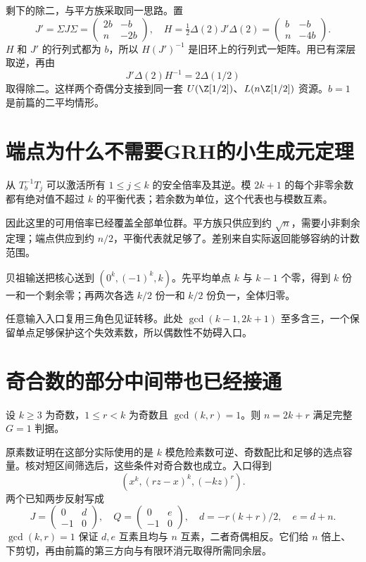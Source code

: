 剩下的除二，与平方族采取同一思路。置
\[
J'=\Sigma J\Sigma=\begin{pmatrix}2b&-b\\n&-2b\end{pmatrix},
\quad H=\tfrac12\Delta(2)J'\Delta(2)
=\begin{pmatrix}b&-b\\n&-4b\end{pmatrix}.
\]
$H$ 和 $J'$ 的行列式都为 $b$，所以 $H(J')^{-1}$ 是旧环上的行列式一矩阵。用已有深层取逆，再由
\[J'\Delta(2)H^{-1}=2\Delta(1/2)
\]
取得除二。这样两个奇偶分支接到同一套 $U(\Z[1/2])$、$L(n\Z[1/2])$ 资源。$b=1$ 是前篇的二平均情形。

\section{端点为什么不需要GRH的小生成元定理}
从 $T_b^{-1}T_j$ 可以激活所有 $1\le j\le k$ 的安全倍率及其逆。模 $2k+1$ 的每个非零余数都有绝对值不超过 $k$ 的平衡代表；若余数为单位，这个代表也与模数互素。

因此这里的可用倍率已经覆盖全部单位群。平方族只供应到约 $\sqrt n$，需要小非剩余定理；端点供应到约 $n/2$，平衡代表就足够了。差别来自实际返回能够容纳的计数范围。

贝祖输送把核心送到 $(0^k,(-1)^k,k)$。先平均单点 $k$ 与 $k-1$ 个零，得到 $k$ 份一和一个剩余零；再两次各选 $k/2$ 份一和 $k/2$ 份负一，全体归零。

任意输入入口复用三角色见证转移。此处 $\gcd(k-1,2k+1)$ 至多含三，一个保留单点足够保护这个失效素数，所以偶数性不妨碍入口。

\section{奇合数的部分中间带也已经接通}
\begin{theorem}[奇元数的互素奇余量]
设 $k\ge3$ 为奇数，$1\le r<k$ 为奇数且 $\gcd(k,r)=1$。则 $n=2k+r$ 满足完整 $G=1$ 判据。
\end{theorem}
原素数证明在这部分实际使用的是 $k$ 模危险素数可逆、奇数配比和足够的选点容量。核对短区间筛选后，这些条件对奇合数也成立。入口得到
\[(x^k,(rz-x)^k,(-kz)^r).
\]
两个已知两步反射写成
\[J=\begin{pmatrix}0&d\\-1&0\end{pmatrix},\quad
Q=\begin{pmatrix}0&e\\-1&0\end{pmatrix},\quad
d=-r(k+r)/2,\quad e=d+n.
\]
$\gcd(k,r)=1$ 保证 $d,e$ 互素且均与 $n$ 互素，二者奇偶相反。它们给 $n$ 倍上、下剪切，再由前篇的第三方向与有限环消元取得所需同余层。

